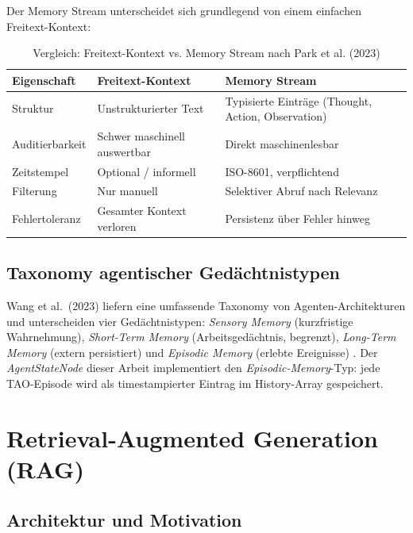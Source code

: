 \documentclass[12pt,a4paper,oneside]{report}
\begin{document}
Der Memory Stream unterscheidet sich grundlegend von einem einfachen Freitext-Kontext:

\begin{table}[H]
  \centering
  \caption{Vergleich: Freitext-Kontext vs. Memory Stream nach Park et al. (2023)}
  \label{tab:memory-comparison}
  \begin{tabularx}{\textwidth}{lXX}
    \toprule
    \textbf{Eigenschaft} & \textbf{Freitext-Kontext} & \textbf{Memory Stream} \\
    \midrule
    Struktur       & Unstrukturierter Text       & Typisierte Einträge (Thought, Action, Observation) \\
    Auditierbarkeit & Schwer maschinell auswertbar & Direkt maschinenlesbar \\
    Zeitstempel    & Optional / informell          & ISO-8601, verpflichtend \\
    Filterung      & Nur manuell                   & Selektiver Abruf nach Relevanz \\
    Fehlertoleranz & Gesamter Kontext verloren     & Persistenz über Fehler hinweg \\
    \bottomrule
  \end{tabularx}
\end{table}

\subsection{Taxonomy agentischer Gedächtnistypen}

Wang et al.\ (2023) liefern eine umfassende Taxonomy von Agenten-Architekturen und
unterscheiden vier Gedächtnistypen: \textit{Sensory Memory} (kurzfristige Wahrnehmung),
\textit{Short-Term Memory} (Arbeitsgedächtnis, begrenzt), \textit{Long-Term Memory}
(extern persistiert) und \textit{Episodic Memory} (erlebte Ereignisse)
\cite{wang2023survey}. Der \textit{AgentStateNode} dieser Arbeit implementiert den
\textit{Episodic-Memory}-Typ: jede \ac{TAO}-Episode wird als timestampierter Eintrag
im History-Array gespeichert.

\section{Retrieval-Augmented Generation (RAG)}
\label{sec:rag}

\subsection{Architektur und Motivation}
\end{document}

